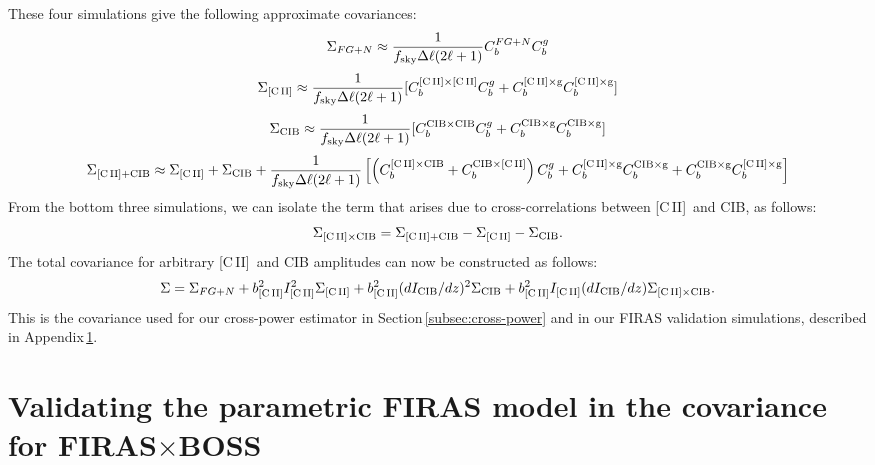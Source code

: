 \documentclass[fleqn,usenatbib]{mnras}
\newcommand{\cii}{[C{\sc\,II}]}
\newcommand{\FB}{FIRAS${\times}$BOSS}
\begin{document}
These four simulations give the following approximate covariances:
\begin{equation}
\Sigma_{FG+N} \approx \frac{1}{f_{\rm sky} \Delta \ell (2\ell + 1)} C_b^{FG+N}C_b^{g}
\end{equation}
\begin{equation}
\Sigma_{\rm \cii} \approx \frac{1}{f_{\rm sky} \Delta \ell (2\ell + 1)} [C_b^{\rm \cii\times \cii}C_b^{g} + C_b^{\rm \cii\times g}C_b^{\rm \cii\times g}]
\end{equation}
\begin{equation}
\Sigma_{\rm CIB} \approx \frac{1}{f_{\rm sky} \Delta \ell (2\ell + 1)} [C_b^{\rm CIB\times CIB}C_b^{g} + C_b^{\rm CIB\times g}C_b^{\rm CIB\times g}]
\end{equation}
\begin{equation}
\Sigma_{\rm \cii + CIB} \approx \Sigma_{\rm \cii} + \Sigma_{\rm CIB} + \frac{1}{f_{\rm sky} \Delta \ell (2\ell + 1)}\left[ \left(C_b^{\rm \cii\times CIB} + C_b^{\rm CIB \times \cii}\right)C_b^{g} + C_b^{\rm \cii\times g}C_b^{\rm CIB\times g} + C_b^{\rm CIB\times g}C_b^{\rm \cii\times g} \right]
\end{equation}
From the bottom three simulations, we can isolate the term that arises due to cross-correlations between \cii\ and CIB, as follows:
\begin{equation}
\Sigma_{\rm \cii \times CIB} = \Sigma_{\rm \cii + CIB} - \Sigma_{\rm \cii} - \Sigma_{\rm CIB}.
\end{equation}
The total covariance for arbitrary \cii\ and CIB amplitudes can now be constructed as follows:
\begin{equation}
\label{eq:update_cov}
\Sigma = \Sigma_{FG+N} +b_{\rm \cii}^2I_{\rm \cii}^2\Sigma_{\rm \cii} + b_{\rm \cii}^2(dI_{\rm CIB}/dz)^2\Sigma_{\rm CIB} + b_{\rm \cii}^2I_{\rm \cii}(dI_{\rm CIB}/dz)\Sigma_{\rm \cii \times CIB}.
\end{equation}
This is the covariance used for our cross-power estimator in Section\,\ref{subsec:cross-power} and in our FIRAS validation simulations, described in Appendix\,\ref{sec:Appendix_cov_sims}. 

\section{Validating the parametric FIRAS model in the covariance for \texorpdfstring{\FB}{FIRASxBOSS}}
\label{sec:Appendix_cov_sims}
\end{document}
